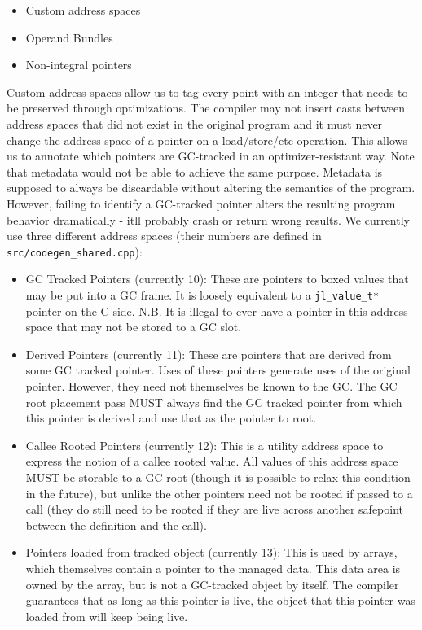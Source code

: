 \begin{itemize}
\item Custom address spaces


\item Operand Bundles


\item Non-integral pointers

\end{itemize}


Custom address spaces allow us to tag every point with an integer that needs to be preserved through optimizations. The compiler may not insert casts between address spaces that did not exist in the original program and it must never change the address space of a pointer on a load/store/etc operation. This allows us to annotate which pointers are GC-tracked in an optimizer-resistant way. Note that metadata would not be able to achieve the same purpose. Metadata is supposed to always be discardable without altering the semantics of the program. However, failing to identify a GC-tracked pointer alters the resulting program behavior dramatically - it{\textquotesingle}ll probably crash or return wrong results. We currently use three different address spaces (their numbers are defined in \texttt{src/codegen\_shared.cpp}):



\begin{itemize}
\item GC Tracked Pointers (currently 10): These are pointers to boxed values that may be put into a GC frame. It is loosely equivalent to a \texttt{jl\_value\_t*} pointer on the C side. N.B. It is illegal to ever have a pointer in this address space that may not be stored to a GC slot.


\item Derived Pointers (currently 11): These are pointers that are derived from some GC tracked pointer. Uses of these pointers generate uses of the original pointer. However, they need not themselves be known to the GC. The GC root placement pass MUST always find the GC tracked pointer from which this pointer is derived and use that as the pointer to root.


\item Callee Rooted Pointers (currently 12): This is a utility address space to express the notion of a callee rooted value. All values of this address space MUST be storable to a GC root (though it is possible to relax this condition in the future), but unlike the other pointers need not be rooted if passed to a call (they do still need to be rooted if they are live across another safepoint between the definition and the call).


\item Pointers loaded from tracked object (currently 13): This is used by arrays, which themselves contain a pointer to the managed data. This data area is owned by the array, but is not a GC-tracked object by itself. The compiler guarantees that as long as this pointer is live, the object that this pointer was loaded from will keep being live.

\end{itemize}


